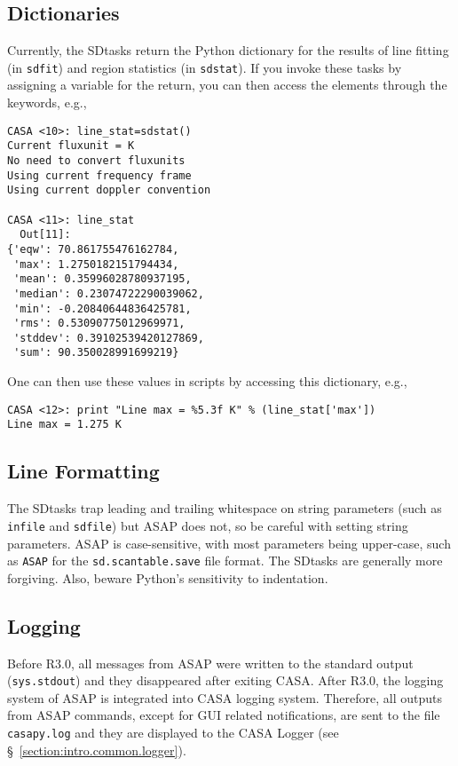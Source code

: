\subsection{Dictionaries}
\label{section:sd.intro.dict}

Currently, the SDtasks return the Python dictionary 
for the results of line fitting (in {\tt sdfit})
and region statistics (in {\tt sdstat}).  If you invoke
these tasks by assigning a variable for the return,
you can then access the
elements through the keywords, e.g.,
\small
\begin{verbatim}
CASA <10>: line_stat=sdstat()
Current fluxunit = K
No need to convert fluxunits
Using current frequency frame
Using current doppler convention

CASA <11>: line_stat
  Out[11]: 
{'eqw': 70.861755476162784,
 'max': 1.2750182151794434,
 'mean': 0.35996028780937195,
 'median': 0.23074722290039062,
 'min': -0.20840644836425781,
 'rms': 0.53090775012969971,
 'stddev': 0.39102539420127869,
 'sum': 90.350028991699219}
\end{verbatim}
\normalsize
One can then use these values in scripts by accessing this dictionary,
e.g.,
\small
\begin{verbatim}
CASA <12>: print "Line max = %5.3f K" % (line_stat['max'])
Line max = 1.275 K
\end{verbatim}
\normalsize

\subsection{Line Formatting}
\label{section:sd.intro.line}

The SDtasks trap leading and trailing whitespace on string parameters
(such as {\tt infile} and {\tt sdfile}) but ASAP does not, so be
careful with setting string parameters.  ASAP is case-sensitive,
with most parameters being upper-case, such as {\tt ASAP} for the
{\tt sd.scantable.save} file format.  The SDtasks are generally
more forgiving.  Also, beware Python's sensitivity to indentation.

\subsection{Logging}
\label{section:sd.intro.log}

Before R3.0, all messages from ASAP were written to the standard output
({\tt sys.stdout}) and they disappeared after exiting CASA. After R3.0, the
logging system of ASAP is integrated into CASA logging system.  Therefore, all outputs from ASAP commands, except for GUI related notifications, are sent to the file {\tt casapy.log} and they
are displayed to the CASA Logger (see \S~\ref{section:intro.common.logger}).

